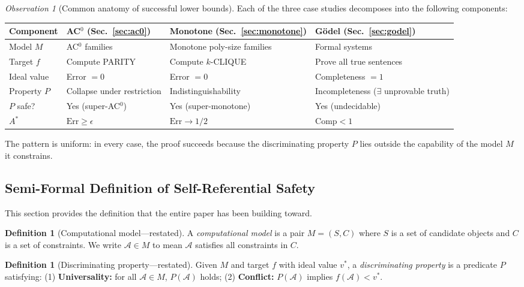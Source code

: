 \documentclass[11pt,a4paper]{article}
\theoremstyle{plain}
\theoremstyle{definition}
\newtheorem{definition}[theorem]{Definition}
\theoremstyle{remark}
\newtheorem{observation}[theorem]{Observation}
\newcommand{\Err}{\mathrm{Err}}
\newcommand{\Comp}{\mathrm{Comp}}
\begin{document}
\begin{observation}[Common anatomy of successful lower bounds]
\label{obs:common}
Each of the three case studies decomposes into the following components:
\end{observation}

\begin{table}[h]
\centering
\small
\begin{tabular}{@{}llll@{}}
\toprule
Component & AC$^0$ (Sec.~\ref{sec:ac0}) & Monotone (Sec.~\ref{sec:monotone}) & G\"{o}del (Sec.~\ref{sec:godel}) \\
\midrule
Model $M$ & AC$^0$ families & Monotone poly-size families & Formal systems \\
Target $f$ & Compute PARITY & Compute $k$-CLIQUE & Prove all true sentences \\
Ideal value & Error $= 0$ & Error $= 0$ & Completeness $= 1$ \\
Property $P$ & Collapse under restriction & Indistinguishability & Incompleteness ($\exists$ unprovable truth) \\
$P$ safe? & Yes (super-AC$^0$) & Yes (super-monotone) & Yes (undecidable) \\
$A^*$ & $\Err \geq \epsilon$ & $\Err \to 1/2$ & $\Comp < 1$ \\
\bottomrule
\end{tabular}
\end{table}

The pattern is uniform: in every case, the proof succeeds because the discriminating property $P$ lies outside the capability of the model $M$ it constrains.

\subsection{Semi-Formal Definition of Self-Referential Safety}

This section provides the definition that the entire paper has been building toward.

\begin{definition}[Computational model---restated]
A \emph{computational model} is a pair $M = (S, C)$ where $S$ is a set of candidate objects and $C$ is a set of constraints. We write $\mathcal{A} \in M$ to mean $\mathcal{A}$ satisfies all constraints in $C$.
\end{definition}

\begin{definition}[Discriminating property---restated]
Given $M$ and target $f$ with ideal value $v^*$, a \emph{discriminating property} is a predicate $P$ satisfying: (1) \textbf{Universality:} for all $\mathcal{A} \in M$, $P(\mathcal{A})$ holds; (2) \textbf{Conflict:} $P(\mathcal{A})$ implies $f(\mathcal{A}) < v^*$.
\end{definition}
\end{document}
